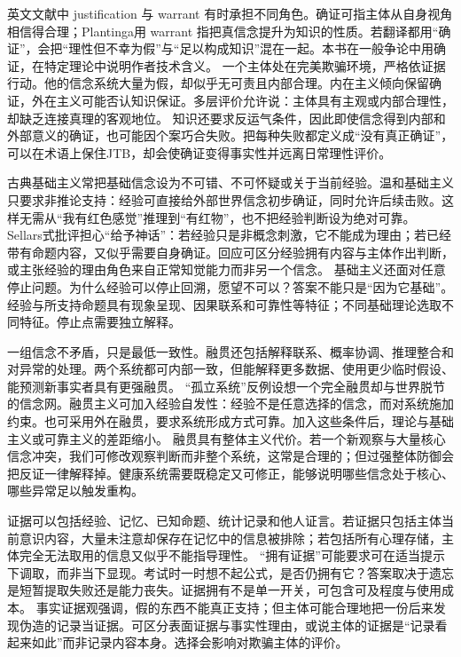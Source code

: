 英文文献中 justification 与 warrant 有时承担不同角色。确证可指主体从自身视角相信得合理；Plantinga用 warrant 指把真信念提升为知识的性质\parencite{plantinga1993}。若翻译都用“确证”，会把“理性但不幸为假”与“足以构成知识”混在一起。本书在一般争论中用确证，在特定理论中说明作者技术含义。 一个主体处在完美欺骗环境，严格依证据行动。他的信念系统大量为假，却似乎无可责且内部合理。内在主义倾向保留确证，外在主义可能否认知识保证。多层评价允许说：主体具有主观或内部合理性，却缺乏连接真理的客观地位。 知识还要求反运气条件，因此即使信念得到内部和外部意义的确证，也可能因个案巧合失败。把每种失败都定义成“没有真正确证”，可以在术语上保住JTB，却会使确证变得事实性并远离日常理性评价。

古典基础主义常把基础信念设为不可错、不可怀疑或关于当前经验。温和基础主义只要求非推论支持：经验可直接给外部世界信念初步确证，同时允许后续击败。这样无需从“我有红色感觉”推理到“有红物”，也不把经验判断设为绝对可靠。 Sellars式批评担心“给予神话”：若经验只是非概念刺激，它不能成为理由；若已经带有命题内容，又似乎需要自身确证。回应可区分经验拥有内容与主体作出判断，或主张经验的理由角色来自正常知觉能力而非另一个信念。 基础主义还面对任意停止问题。为什么经验可以停止回溯，愿望不可以？答案不能只是“因为它基础”。经验与所支持命题具有现象呈现、因果联系和可靠性等特征；不同基础理论选取不同特征。停止点需要独立解释。

一组信念不矛盾，只是最低一致性。融贯还包括解释联系、概率协调、推理整合和对异常的处理。两个系统都可内部一致，但能解释更多数据、使用更少临时假设、能预测新事实者具有更强融贯。 “孤立系统”反例设想一个完全融贯却与世界脱节的信念网。融贯主义可加入经验自发性：经验不是任意选择的信念，而对系统施加约束。也可采用外在融贯，要求系统形成方式可靠。加入这些条件后，理论与基础主义或可靠主义的差距缩小。 融贯具有整体主义代价。若一个新观察与大量核心信念冲突，我们可修改观察判断而非整个系统，这常是合理的；但过强整体防御会把反证一律解释掉。健康系统需要既稳定又可修正，能够说明哪些信念处于核心、哪些异常足以触发重构。

证据可以包括经验、记忆、已知命题、统计记录和他人证言。若证据只包括主体当前意识内容，大量未注意却保存在记忆中的信息被排除；若包括所有心理存储，主体完全无法取用的信息又似乎不能指导理性。 “拥有证据”可能要求可在适当提示下调取，而非当下显现。考试时一时想不起公式，是否仍拥有它？答案取决于遗忘是短暂提取失败还是能力丧失。证据拥有不是单一开关，可包含可及程度与使用成本。 事实证据观强调，假的东西不能真正支持；但主体可能合理地把一份后来发现伪造的记录当证据。可区分表面证据与事实性理由，或说主体的证据是“记录看起来如此”而非记录内容本身。选择会影响对欺骗主体的评价。

